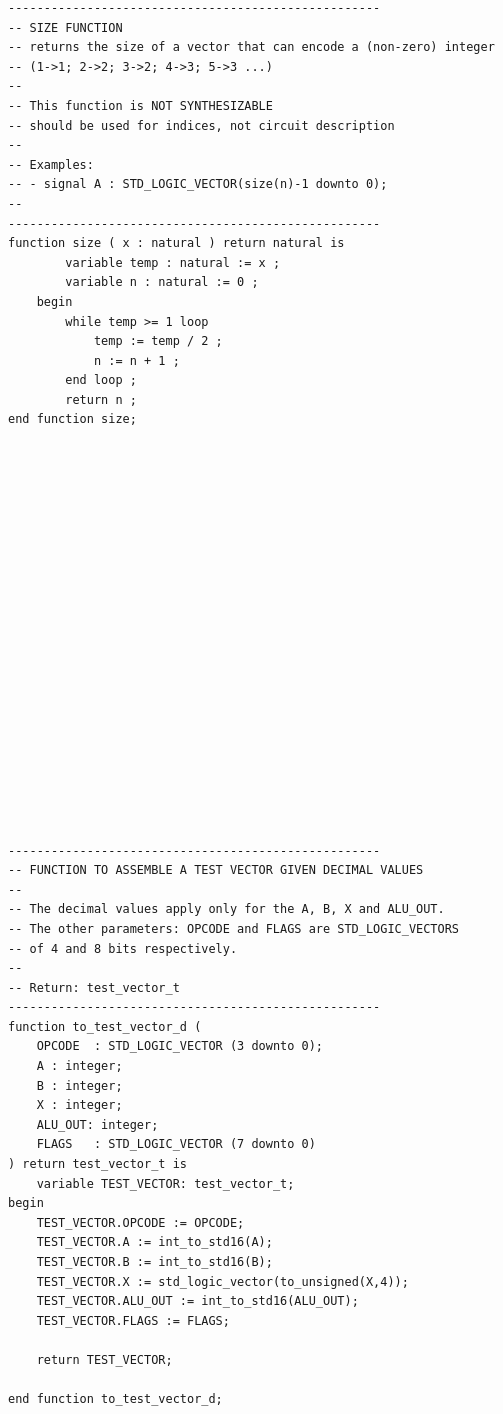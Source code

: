 \documentclass[10pt]{article}
\begin{document}
\begin{verbatim}
----------------------------------------------------
-- SIZE FUNCTION
-- returns the size of a vector that can encode a (non-zero) integer
-- (1->1; 2->2; 3->2; 4->3; 5->3 ...)
--
-- This function is NOT SYNTHESIZABLE 
-- should be used for indices, not circuit description
-- 
-- Examples:
-- - signal A : STD_LOGIC_VECTOR(size(n)-1 downto 0);
-- 
----------------------------------------------------
function size ( x : natural ) return natural is
        variable temp : natural := x ;
        variable n : natural := 0 ;
    begin
        while temp >= 1 loop
            temp := temp / 2 ;
            n := n + 1 ;
        end loop ;
        return n ;
end function size;





















----------------------------------------------------
-- FUNCTION TO ASSEMBLE A TEST VECTOR GIVEN DECIMAL VALUES
-- 
-- The decimal values apply only for the A, B, X and ALU_OUT.
-- The other parameters: OPCODE and FLAGS are STD_LOGIC_VECTORS
-- of 4 and 8 bits respectively.
--
-- Return: test_vector_t
----------------------------------------------------
function to_test_vector_d (
    OPCODE  : STD_LOGIC_VECTOR (3 downto 0);
    A : integer;
    B : integer;
    X : integer;
    ALU_OUT: integer;
    FLAGS   : STD_LOGIC_VECTOR (7 downto 0)
) return test_vector_t is
    variable TEST_VECTOR: test_vector_t;
begin
    TEST_VECTOR.OPCODE := OPCODE;
    TEST_VECTOR.A := int_to_std16(A);
    TEST_VECTOR.B := int_to_std16(B);
    TEST_VECTOR.X := std_logic_vector(to_unsigned(X,4));
    TEST_VECTOR.ALU_OUT := int_to_std16(ALU_OUT);
    TEST_VECTOR.FLAGS := FLAGS;
    
    return TEST_VECTOR;

end function to_test_vector_d;















\end{verbatim}
\end{document}
